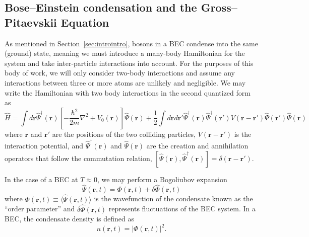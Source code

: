 \subsection{Bose--Einstein condensation and the Gross--Pitaevskii Equation}

As mentioned in Section~\ref{sec:introintro}, bosons in a BEC condense into the same (ground) state, meaning we must introduce a many-body Hamiltonian for the system and take inter-particle interactions into account.
For the purposes of this body of work, we will only consider two-body interactions and assume any interactions between three or more atoms are unlikely and negligible.
We may write the Hamiltonian with two body interactions in the second quantized form as
\begin{equation}
    \hat H = \int d\mathbf{r} \hat \Psi^\dagger(\mathbf{r})\left[-\frac{\hbar^2}{2m}\nabla^2 + V_0(\mathbf{r}) \right]\hat \Psi(\mathbf{r}) + \frac{1}{2} \int d\mathbf{r} d\mathbf{r'} \hat \Psi^\dagger(\mathbf{r}) \hat \Psi^\dagger(\mathbf{r'}) V(\mathbf{r} - \mathbf{r'})\hat \Psi(\mathbf{r'}) \hat \Psi(\mathbf{r})
    \label{eqn:2nd}
\end{equation}
where $\mathbf{r}$ and $\mathbf{r'}$ are the positions of the two colliding particles, $V(\mathbf{r}-\mathbf{r'})$ is the interaction potential, and $\hat \Psi^\dagger(\mathbf{r})$ and $\hat \Psi(\mathbf{r})$ are the creation and annihilation operators that follow the commutation relation, $[\hat \Psi(\mathbf{r}),\hat \Psi^\dagger(\mathbf{r})] = \delta(\mathbf{r} - \mathbf{r'})$.

In the case of a BEC at $T\approx0$, we may perform a Bogoliubov expansion~\cite{Bogoliubov1947, Dalfovo1999}
\begin{equation}
    \hat \Psi (\mathbf{r}, t) = \Phi(\mathbf{r},t) + \delta \hat \Phi(\mathbf{r},t)
\label{eqn:bog}
\end{equation}
where $\Phi(\mathbf{r},t) \equiv \langle \hat \Psi(\mathbf{r},t) \rangle$ is the wavefunction of the condensate known as the ``order parameter'' and $\delta \hat \Phi(\mathbf{r},t)$ represents fluctuations of the BEC system.
In a BEC, the condensate density is defined as
\begin{equation}
    n(\mathbf{r},t) = |\Phi(\mathbf{r},t)|^2.
\end{equation}

